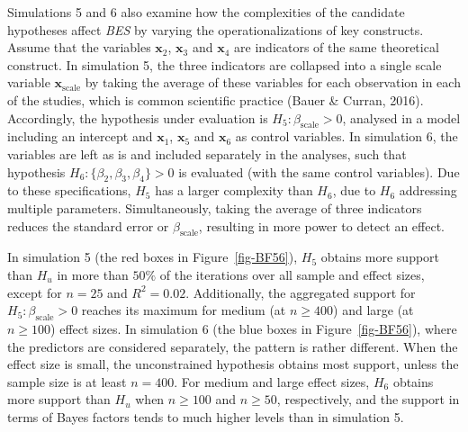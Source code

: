 \documentclass[
]{interact}
\begin{document}
                    Simulations 5 and 6 also examine how the complexities of the candidate
                    hypotheses affect \emph{BES} by varying the operationalizations of key
                    constructs. Assume that the variables \(\boldsymbol{x}_2\),
                    \(\boldsymbol{x}_3\) and \(\boldsymbol{x}_4\) are indicators of the same
                    theoretical construct. In simulation 5, the three indicators are
                    collapsed into a single scale variable \(\boldsymbol{x}_{\text{scale}}\)
                    by taking the average of these variables for each observation in each of
                    the studies, which is common scientific practice (Bauer \& Curran,
                                                                      2016). Accordingly, the hypothesis under evaluation is
                    \(H_5: \beta_{\text{scale}} > 0\), analysed in a model including an
                    intercept and \(\boldsymbol{x}_1\), \(\boldsymbol{x}_5\) and
                    \(\boldsymbol{x}_6\) as control variables. In simulation 6, the
                    variables are left as is and included separately in the analyses, such
                    that hypothesis \(H_6: \{\beta_2,\beta_3,\beta_4\} > 0\) is evaluated
                    (with the same control variables). Due to these specifications, \(H_5\)
                    has a larger complexity than \(H_6\), due to \(H_6\) addressing multiple
                    parameters. Simultaneously, taking the average of three indicators
                    reduces the standard error or \(\beta_{\text{scale}}\), resulting in
                    more power to detect an effect.
                    
                    In simulation 5 (the red boxes in Figure~\ref{fig-BF56}), \(H_5\)
                    obtains more support than \(H_u\) in more than \(50\%\) of the
                    iterations over all sample and effect sizes, except for \(n = 25\) and
                    \(R^2 = 0.02\). Additionally, the aggregated support for
                    \(H_5: \beta_{\text{scale}}>0\) reaches its maximum for medium (at
                                                                                    \(n \geq 400\)) and large (at \(n \geq 100\)) effect sizes. In
                    simulation 6 (the blue boxes in Figure~\ref{fig-BF56}), where the
                    predictors are considered separately, the pattern is rather different.
                    When the effect size is small, the unconstrained hypothesis obtains most
                    support, unless the sample size is at least \(n = 400\). For medium and
                    large effect sizes, \(H_6\) obtains more support than \(H_u\) when
                    \(n \geq 100\) and \(n \geq 50\), respectively, and the support in terms
                    of Bayes factors tends to much higher levels than in simulation 5.
                    
\end{document}
